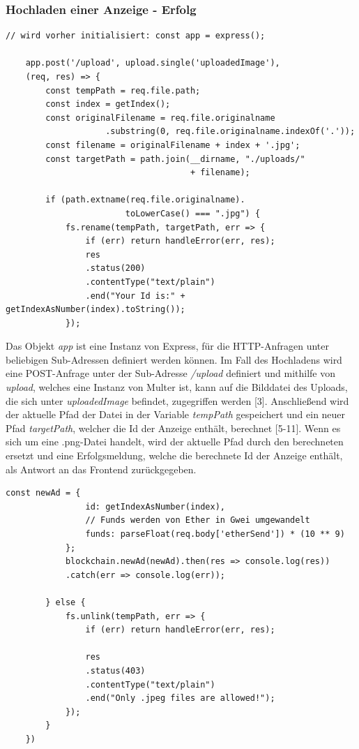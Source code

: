 \subsubsection{Hochladen einer Anzeige - Erfolg}
\begin{lstlisting}[caption={Hochladen auf das Backend bei Erfolg},captionpos=b]
	// wird vorher initialisiert: const app = express();
	
	app.post('/upload', upload.single('uploadedImage'), 
	(req, res) => {
		const tempPath = req.file.path;
		const index = getIndex();
		const originalFilename = req.file.originalname
					.substring(0, req.file.originalname.indexOf('.'));
		const filename = originalFilename + index + '.jpg';
		const targetPath = path.join(__dirname, "./uploads/"
									 + filename);
		
		if (path.extname(req.file.originalname).
						toLowerCase() === ".jpg") {
			fs.rename(tempPath, targetPath, err => {
				if (err) return handleError(err, res);
				res
				.status(200)
				.contentType("text/plain")
				.end("Your Id is:" + getIndexAsNumber(index).toString());
			});
\end{lstlisting}
Das Objekt \emph{app} ist eine Instanz von Express, für die HTTP-Anfragen unter beliebigen Sub-Adressen definiert werden können. Im Fall des Hochladens wird eine POST-Anfrage unter der Sub-Adresse \emph{/upload} definiert und mithilfe von \emph{upload}, welches eine Instanz von Multer ist, kann auf die Bilddatei des Uploads, die sich unter \emph{uploadedImage} befindet, zugegriffen werden [3]. Anschließend wird der aktuelle Pfad der Datei in der Variable \emph{tempPath} gespeichert und ein neuer Pfad \emph{targetPath}, welcher die Id der Anzeige enthält, berechnet [5-11]. Wenn es sich um eine .png-Datei handelt, wird der aktuelle Pfad durch den berechneten ersetzt und eine Erfolgsmeldung, welche die berechnete Id der Anzeige enthält, als Antwort an das Frontend zurückgegeben.
\begin{lstlisting}[caption={Setzen neuer Anzeige im Backend oder bei Fehler zurücksetzen},captionpos=b]
			const newAd = {
				id: getIndexAsNumber(index),
				// Funds werden von Ether in Gwei umgewandelt
				funds: parseFloat(req.body['etherSend']) * (10 ** 9)
			};
			blockchain.newAd(newAd).then(res => console.log(res))
			.catch(err => console.log(err));
			
		} else {
			fs.unlink(tempPath, err => {
				if (err) return handleError(err, res);
				
				res
				.status(403)
				.contentType("text/plain")
				.end("Only .jpeg files are allowed!");
			});
		}
	})
\end{lstlisting}
